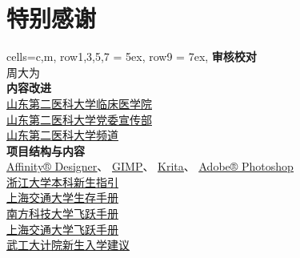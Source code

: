 \chapter*{特别感谢}
\begin{table}[H]
    \centering
    \begin{tblr}[
            theme = {no-caption},
        ]{
            cells={c,m},
            row{1,3,5,7} = {5ex},
            row{9} = {7ex},
        }
        {\large\textbf{审核校对}}                                                                 \\
        {周大为}                                                                                  \\
        {\large\textbf{内容改进}}                                                                 \\
        {
        \uline{\href{https://xchb.sdsmu.edu.cn}{山东第二医科大学临床医学院}}                      \\
        \uline{\href{https://xchb.sdsmu.edu.cn}{山东第二医科大学党委宣传部}}                      \\
        \uline{\href{https://pd.qq.com/s/7mekdr5ve}{山东第二医科大学频道}}
        }                                                                                         \\
        {\large\textbf{项目结构与内容}}                                                           \\
        {
        \uline{\href{https://affinity.serif.com/zh-cn/designer}{Affinity® Designer}}、%
        \uline{\href{https://www.gimp.org/}{GIMP}}、%
        \uline{\href{https://krita.org/zh-cn}{Krita}}、%
        \uline{\href{https://www.adobe.com/cn/creativecloud/roc/business.html}{Adobe® Photoshop}} \\
        \uline{\href{https://zjuers.com/welcome}{浙江大学本科新生指引}}                           \\
        \uline{\href{https://survivesjtu.gitbook.io/survivesjtumanual}{上海交通大学生存手册}}     \\
        \uline{\href{https://sustech-application.com}{南方科技大学飞跃手册}}                      \\
        \uline{\href{https://survivesjtu.github.io/SJTU-Application}{上海交通大学飞跃手册}}       \\
        \uline{\href{https://gitee.com/hanyaner/witjij}{武工大计院新生入学建议}}
        }                                                                                         \\

\end{tblr}
\end{table}
